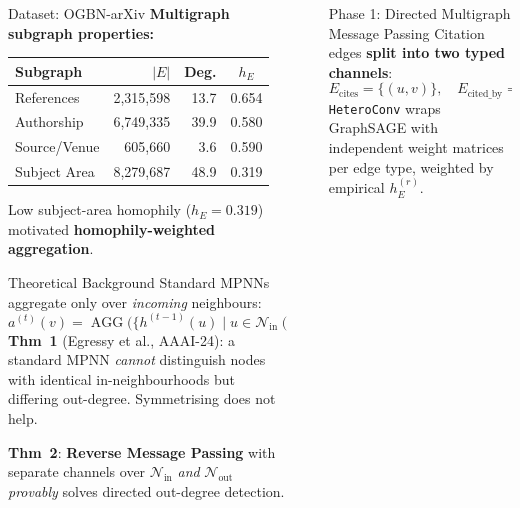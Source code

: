\documentclass[final]{beamer}
\newlength{\sepwidth}
\newlength{\colwidth}
\newcommand{\separatorcolumn}{\begin{column}{\sepwidth}\end{column}}
\newcommand{\pipelinediagram}{%
\begin{tikzpicture}[
  node distance = 3mm and 4mm,
  phase/.style  = {rounded corners=4pt, draw=#1!70, fill=#1!10,
                   text width=19em, minimum height=2.4em,
                   align=center, font=\small\bfseries, text=#1!80!black},
  arrow/.style  = {-{Stealth[length=4pt]}, thick, color=gray!60},
  label/.style  = {font=\scriptsize, text=gray!70},
  result/.style = {font=\scriptsize\itshape, text=black!70, align=center}
]
  \node[phase=ph1col] (p1)
    {Phase 1 \textbf{|} Directed Multigraph MP\\
     \scriptsize Edge split: \texttt{cites} + \texttt{cited\_by} via HeteroConv};

  \node[result, below=1mm of p1]
    (r1) {\textcolor{ph1col!80!black}{$\to$ 79.02\% val (first untuned run)}};

  \node[phase=ph2col, below=2mm of r1] (p2)
    {Phase 2 \textbf{|} Targeted Regularisation\\
     \scriptsize DropEdge ($p{=}0.50$) + Perturbation + 3-Ensemble};

  \node[result, below=1mm of p2]
    (r2) {\textcolor{ph2col!80!black}{$\to$ 78.14\% micro (+0.53 pp)}};

  \node[phase=ph3col, below=2mm of r2] (p3)
    {Phase 3 \textbf{|} GraphSMOTE Topology Balancing\\
     \scriptsize 10{,}090 synthetic nodes for 16 minority classes};

  \node[result, below=1mm of p3]
    (r3) {\textcolor{ph3col!80!black}{$\to$ Class~12 (5 samples): 100\% acc.}};

  \node[phase=ph4col, below=2mm of r3] (p4)
    {Phase 4 \textbf{|} Lexical-Semantic Late-Fusion\\
     \scriptsize TF-IDF (500d) $\|$ SimTG (1024d) $=$ 1524-dim features};

  \node[result, below=1mm of p4]
    (r4) {\textcolor{ph4col!80!black}{$\to$ Macro: $<$50\% $\Rightarrow$ \textbf{65.99\%}}};

  \draw[arrow] (p1.south) -- (p2.north);
  \draw[arrow] (p2.south) -- (p3.north);
  \draw[arrow] (p3.south) -- (p4.north);
\end{tikzpicture}%
}
\begin{document}
\begin{frame}[t]
\begin{columns}[t]
\begin{column}{\colwidth}
\begin{block}{Dataset: OGBN-arXiv}
    \smallskip\noindent\textbf{Multigraph subgraph properties:}
    \begin{center}
    \begin{tabular}{lrrc}
      \toprule
      \textbf{Subgraph} & \textbf{$|E|$} & \textbf{Deg.} & \textbf{$h_E$}\\
      \midrule
      References   & 2{,}315{,}598 & 13.7 & 0.654\\
      Authorship   & 6{,}749{,}335 & 39.9 & 0.580\\
      Source/Venue &   605{,}660   &  3.6 & 0.590\\
      Subject Area & 8{,}279{,}687 & 48.9 & \textcolor{negativered}{0.319}\\
      \bottomrule
    \end{tabular}
    \end{center}
    Low subject-area homophily ($h_E{=}0.319$) motivated
    \textbf{homophily-weighted aggregation}.
  \end{block}

  \begin{block}{Theoretical Background}
    Standard MPNNs aggregate only over \emph{incoming} neighbours:
    \[
      a^{(t)}(v)=\operatorname{AGG}\!\bigl(\{h^{(t-1)}(u)\mid u\in\mathcal{N}_\text{in}(v)\}\bigr)
    \]
    \textbf{Thm~1} (Egressy et al., AAAI-24): a standard MPNN
    \emph{cannot} distinguish nodes with identical in-neighbourhoods but
    differing out-degree. Symmetrising does not help.

    \smallskip
    \textbf{Thm~2}: \textbf{Reverse Message Passing} with separate channels
    over $\mathcal{N}_\text{in}$ \emph{and} $\mathcal{N}_\text{out}$
    \emph{provably} solves directed out-degree detection.
  \end{block}

\end{column}
\separatorcolumn

\begin{column}{\colwidth}


  \begin{block}{Phase 1: Directed Multigraph Message Passing}
    Citation edges \textbf{split into two typed channels}:
    \[
      E_\text{cites}=\{(u,v)\},\quad E_\text{cited\_by}=\{(v,u)\}
    \]
    \texttt{HeteroConv} wraps GraphSAGE with independent weight matrices per
    edge type, weighted by empirical $h_E^{(r)}$.


\end{block}
\end{column}
\end{columns}
\end{frame}
\end{document}
